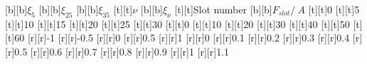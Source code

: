 %    
%
%
\begin{psfrags}%
\psfragscanon%
%
[b][b]{$\xi_{5}$}%
[b][b]{$\xi_{25}$}%
[b][b]{$\xi_{35}$}%
[t][t]{$\nu$}%
[b][b]{$\xi_{\nu}$}%
[t][t]{Slot number}%
[b][b]{$F_{slot}/\SI{}{A}$}%
%
[t][t]{0}%
[t][t]{5}%
[t][t]{10}%
[t][t]{15}%
[t][t]{20}%
[t][t]{25}%
[t][t]{30}%
[t][t]{0}%
[t][t]{10}%
[t][t]{20}%
[t][t]{30}%
[t][t]{40}%
[t][t]{50}%
[t][t]{60}%
%
[r][r]{-1}%
[r][r]{-0.5}%
[r][r]{0}%
[r][r]{0.5}%
[r][r]{1}%
[r][r]{0}%
[r][r]{0.1}%
[r][r]{0.2}%
[r][r]{0.3}%
[r][r]{0.4}%
[r][r]{0.5}%
[r][r]{0.6}%
[r][r]{0.7}%
[r][r]{0.8}%
[r][r]{0.9}%
[r][r]{1}%
[r][r]{1.1}%
%

%
\end{psfrags}%
%

